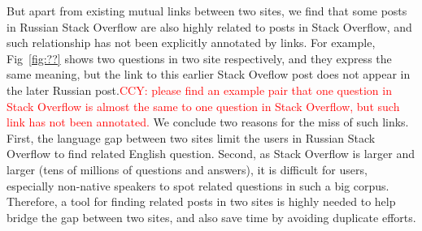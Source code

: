 But apart from existing mutual links between two sites, we find that some posts in Russian Stack Overflow are also highly related to posts in Stack Overflow, and such relationship has not been explicitly annotated by links.
For example, Fig~\ref{fig:??} shows two questions in two site respectively, and they express the same meaning, but the link to this earlier Stack Oveflow post does not appear in the later Russian post.\textcolor{red}{CCY: please find an example pair that one question in Stack Overflow is almost the same to one question in Stack Overflow, but such link has not been annotated.}
We conclude two reasons for the miss of such links.
First, the language gap between two sites limit the users in Russian Stack Overflow to find related English question.
Second, as Stack Overflow is larger and larger (tens of millions of questions and answers), it is difficult for users, especially non-native speakers to spot related questions in such a big corpus.
Therefore, a tool for finding related posts in two sites is highly needed to help bridge the gap between two sites, and also save time by avoiding duplicate efforts.


